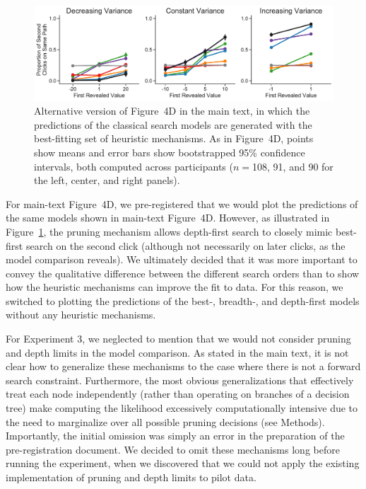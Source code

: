 \begin{figure}[h!]
    \centering
    \includegraphics[width=\textwidth]{figs/planning/second_click_alt.pdf}
    \caption{Alternative version of Figure~4D in the main text, in which the predictions of the classical search models are generated with the best-fitting set of heuristic mechanisms. As in Figure~4D, points show means and error bars show bootstrapped 95\% confidence intervals, both computed across participants ($n=$108, 91, and 90 for the left, center, and right panels).
    }
    \label{fig:second_click_alt}
\end{figure}

For main-text Figure~4D, we pre-registered that we would plot the predictions of the same models shown in main-text Figure~4D. However, as illustrated in Figure~\ref{fig:second_click_alt}, the pruning mechanism allows depth-first search to closely mimic best-first search on the second click (although not necessarily on later clicks, as the model comparison reveals). We ultimately decided that it was more important to convey the qualitative difference between the different search orders than to show how the heuristic mechanisms can improve the fit to data. For this reason, we switched to plotting the predictions of the best-, breadth-, and depth-first models without any heuristic mechanisms.

For Experiment 3, we neglected to mention that we would not consider pruning and depth limits in the model comparison. As stated in the main text, it is not clear how to generalize these mechanisms to the case where there is not a forward search constraint. Furthermore, the most obvious generalizations that effectively treat each node independently (rather than operating on branches of a decision tree) make computing the likelihood excessively computationally intensive due to the need to marginalize over all possible pruning decisions (see Methods). Importantly, the initial omission was simply an error in the preparation of the pre-registration document. We decided to omit these mechanisms long before running the experiment, when we discovered that we could not apply the existing implementation of pruning and depth limits to pilot data.

